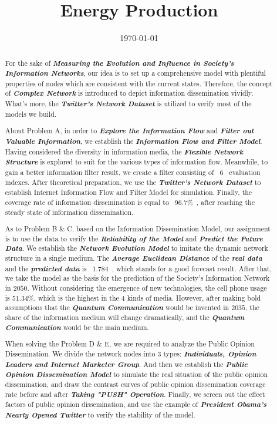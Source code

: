 \documentclass[a4paper,11pt]{article}
\title{Energy Production}%
\date{\today}
\begin{document}
\begin{abstract}

\par For the sake of \textbf{\emph{Measuring the Evolution and Influence in Society's Information Networks}}, our idea is to set up a comprehensive model with plentiful properties of nodes which are consistent with the current states. Therefore, the concept of \textbf{\emph{Complex Network}} is introduced to depict information dissemination vividly. What's more, the \textbf{\emph{Twitter's Network Dataset}} is utilized to verify most of the models we build.


\par About Problem A, in order to \textbf{\emph{Explore the Information Flow}} and \textbf{\emph{Filter out Valuable Information}}, we establish the \textbf{\emph{Information Flow and Filter Model}}. Having considered the diversity in information media, the \textbf{\emph{Flexible Network Structure}} is explored to suit for the various types of information flow. Meanwhile, to gain a better information filter result, we create a filter consisting of ~$6$~ evaluation indexes. After theoretical preparation, we use the \textbf{\emph{Twitter's Network Dataset}} to establish Internet Information Flow and Filter Model for simulation. Finally, the coverage rate of information dissemination is equal to ~$96.7\%$~, after reaching the steady state of information dissemination.


\par As to Problem B \& C, based on the Information Dissemination Model, our assignment is to use the data to verify the \emph{\textbf{Reliability of the Model}} and \emph{\textbf{Predict the Future Data}}. We establish the \emph{\textbf{Network Evolution Model}} to imitate the dynamic network structure in a single medium. The \textbf{\emph{Average Euclidean Distance}} of the \textbf{\emph{real data}} and the \emph{\textbf{predicted data}} is ~$1.784$~, which stands for a good forecast result. After that, we take the model as the basis for the prediction of the Society's Information Network in $2050$. Without considering the emergence of new technologies, the cell phone usage is 51.34\%, which is the highest in the $4$ kinds of media. However, after making bold assumptions that the \emph{\textbf{Quantum Communication}} would be invented in $2035$, the share of the information medium will change dramatically, and the \emph{\textbf{Quantum Communication }} would be the main medium.

\par  When solving the Problem D \& E, we are required to analyze the Public Opinion Dissemination. We divide the network nodes into $3$ types: \textbf{\emph{Individuals, Opinion Leaders and Internet Marketer Group}}. And then we establish the \emph{\textbf{Public Opinion Dissemination Model}} to simulate the real situation of the public opinion dissemination, and draw the contrast curves of public opinion dissemination coverage rate before and after \textbf{\emph{Taking "PUSH" Operation}}. Finally, we screen out the effect factors of public opinion dissemination, and use the example of \textbf{\emph{President Obama's Nearly Opened Twitter}} to verify the stability of the model.



\end{abstract}
\end{document}
